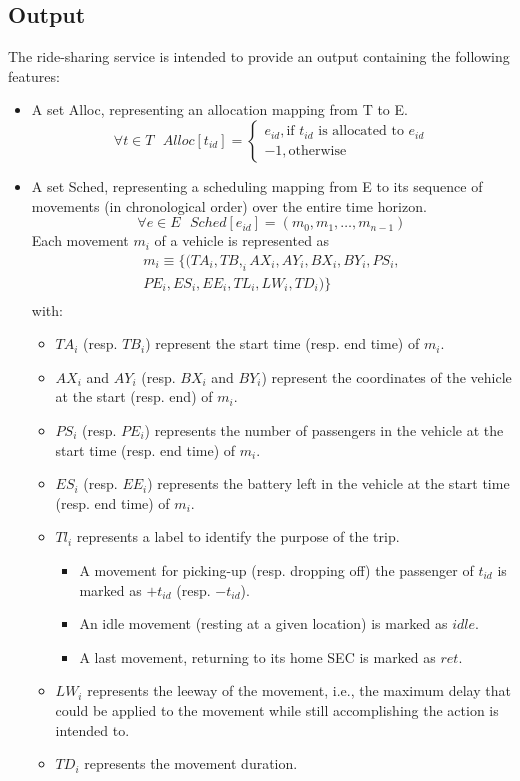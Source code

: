 \subsection{Output}
The ride-sharing service is intended to provide an output containing the following features:
\begin{itemize}
    \item A set Alloc, representing an allocation mapping from T to E. 
    \[
    \forall t\in T
    \text{ }Alloc[t_{id}] = 
    \begin{cases}
        e_{id},  \text{if }  t_{id} \text{ is allocated to } e_{id}\\
        -1,  \text{otherwise}
    \end{cases}
    \]
    \item A set Sched, representing a scheduling mapping from E to its sequence of movements (in chronological order) over the entire time horizon. 
    \[
    \forall e\in E
    \text{ }Sched[e_{id}] = ( m_0,  m_1,  \ldots,  m_{n-1} ) 
    \]
    Each movement $m_i$ of a vehicle is represented as
    \begin{align*}
    m_i \equiv \{ ( TA_i, TB,_i AX_i, AY_i, BX_i, BY_i, PS_i, \\
        PE_i, ES_i, EE_i, TL_i, LW_i, TD_i ) \} \\  
    \end{align*}	
    with: 
\begin{itemize}
    \item $TA_i$ (resp. $TB_i$) represent the start time (resp.  end time) of $m_i$. 
    \item $AX_i$ and $AY_i$ (resp.   $BX_i$ and $BY_i$) represent the coordinates of the vehicle at the start (resp. end) of $m_i$.
    \item $PS_i$ (resp. $PE_i$) represents the number of passengers in the vehicle at the start time (resp. end time) of $m_i$. 
    \item $ES_i$ (resp. $EE_i$) represents the battery left in the vehicle at the start time (resp. end time) of $m_i$. 
    \item $Tl_i$ represents a label to identify the purpose of the trip. 
    \begin{itemize}
    \item A movement for picking-up (resp. dropping off) the passenger of $t_{id}$ is marked as $+t_{id}$ (resp.  $-t_{id}$).
    \item An idle movement (resting at a given location) is marked as $idle$. 
    \item A last movement, returning to its home SEC is marked as $ret$.  
    \end{itemize}
    \item $LW_i$ represents the leeway of the movement, i.e., the maximum delay that could be applied to the movement while still accomplishing the action is intended to. 
    \item $TD_i$ represents the movement duration. 
\end{itemize}
\end{itemize}
